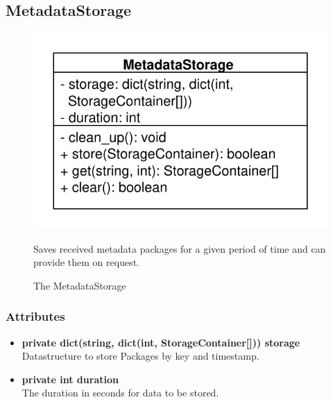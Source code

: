 \subsection{MetadataStorage}
\begin{figure}[htbp]
	\begin{minipage}[t]{7cm}
		\vspace{0pt}
		\centering
		\includegraphics[scale=0.6]{./diagram_pictures/MetadataStorage.pdf}
		\caption{The MetadataStorage}
	\end{minipage}
	\hfill
	\begin{minipage}[t]{8cm}
		\vspace{10pt}
		Saves received metadata packages for a given period of time and can provide them on request.
	\end{minipage}
\end{figure}

\subsubsection{Attributes}
\begin{itemize}
	\item \textbf{private dict(string, dict(int, StorageContainer[])) storage}\\
	Datastructure to store Packages by key and timestamp.
	\item \textbf{private int duration}\\
	The duration in seconds for data to be stored.
\end{itemize}

